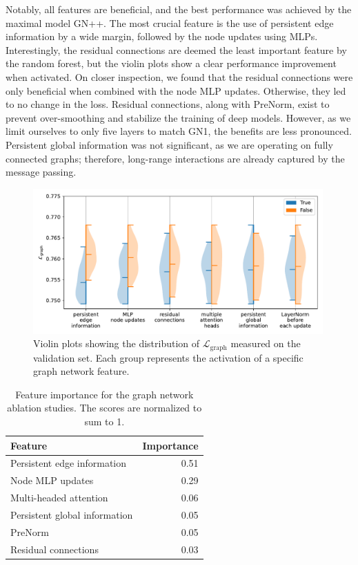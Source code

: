 Notably, all features are beneficial, and the best performance was achieved by the maximal model GN++.
The most crucial feature is the use of persistent edge information by a wide margin, followed by the node updates using MLPs.
Interestingly, the residual connections are deemed the least important feature by the random forest, but the violin plots show a clear performance improvement when activated.
On closer inspection, we found that the residual connections were only beneficial when combined with the node MLP updates.
Otherwise, they led to no change in the loss.
Residual connections, along with PreNorm, exist to prevent over-smoothing and stabilize the training of deep models.
However, as we limit ourselves to only five layers to match GN1, the benefits are less pronounced.
Persistent global information was not significant, as we are operating on fully connected graphs; therefore, long-range interactions are already captured by the message passing.

\begin{figure}[ht]
    \centering
    \includegraphics[width=0.99\textwidth]{figures/flavour_tagging/violin.pdf}
    \caption{Violin plots showing the distribution of $\mathcal{L}_{\text{graph}}$ measured on the validation set. Each group represents the activation of a specific graph network feature.}
    \label{fig:violin}
\end{figure}

\begin{table}
    \centering
    \begin{tabular}{lr}
        \toprule
        Feature & Importance \\
        \midrule
        Persistent edge information & 0.51 \\
        Node MLP updates & 0.29 \\
        Multi-headed attention & 0.06 \\
        Persistent global information & 0.05 \\
        PreNorm & 0.05 \\
        Residual connections & 0.03 \\
        \bottomrule
    \end{tabular}
    \caption{Feature importance for the graph network ablation studies. The scores are normalized to sum to 1.}
    \label{tab:feature_importance}
\end{table}

